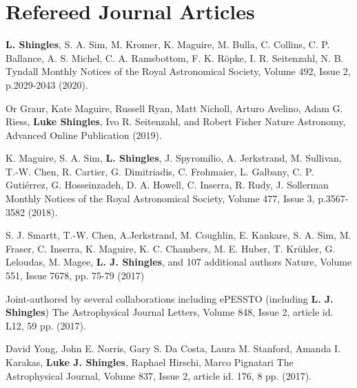 \documentclass[11pt]{article} %
\newcommand{\highlight}[1]{\textbf{#1}}
\begin{document}
\section{Refereed Journal Articles}
\begin{itemize-noindent}
{\highlight{L. Shingles}, S. A. Sim, M. Kromer, K. Maguire, M. Bulla, C. Collins, C. P. Ballance, A. S. Michel, C. A. Ramsbottom, F. K. R\"opke, I. R. Seitenzahl, N. B. Tyndall}
{Monthly Notices of the Royal Astronomical Society, Volume 492, Issue 2, p.2029-2043 (2020).}

{Or Graur, Kate Maguire, Russell Ryan, Matt Nicholl, Arturo Avelino, Adam G. Riess, \highlight{Luke Shingles}, Ivo R. Seitenzahl, and Robert Fisher}
{Nature Astronomy, Advanced Online Publication (2019).}

{K. Maguire, S. A. Sim, \highlight{L. Shingles}, J. Spyromilio, A. Jerkstrand, M. Sullivan, T.-W. Chen, R. Cartier, G. Dimitriadis, C. Frohmaier, L. Galbany, C. P. Gutiérrez, G. Hosseinzadeh, D. A. Howell, C. Inserra, R. Rudy, J. Sollerman}
{Monthly Notices of the Royal Astronomical Society, Volume 477, Issue 3, p.3567-3582 (2018).}

{S. J. Smartt, T.-W. Chen, A.Jerkstrand, M. Coughlin, E. Kankare, S. A. Sim, M. Fraser, C. Inserra, K. Maguire, K. C. Chambers,
M. E. Huber, T. Kr\"uhler, G. Leloudas, M. Magee, \highlight{L. J. Shingles}, and 107 additional authors}
{Nature, Volume 551, Issue 7678, pp. 75-79 (2017)}

{Joint-authored by several collaborations including ePESSTO (including \highlight{L. J. Shingles})}
{The Astrophysical Journal Letters, Volume 848, Issue 2, article id. L12, 59 pp. (2017).}

{David Yong, John E. Norris, Gary S. Da Costa, Laura M. Stanford, Amanda I. Karakas, \highlight{Luke J. Shingles}, Raphael Hirschi, Marco Pignatari}
{The Astrophysical Journal, Volume 837, Issue 2, article id. 176, 8 pp. (2017).}


\end{itemize-noindent}
\end{document}
